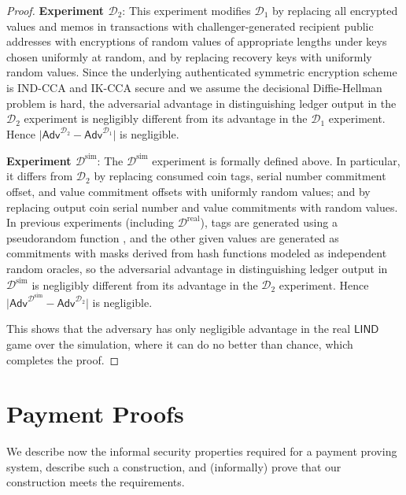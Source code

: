 \documentclass{llncs}
\newcommand{\func}[1]{\mathsf{#1}}
\begin{document}
\begin{proof}
\textbf{Experiment $\mathcal{D}_2$}: This experiment modifies $\mathcal{D}_{1}$ by replacing all encrypted values and memos in transactions with challenger-generated recipient public addresses with encryptions of random values of appropriate lengths under keys chosen uniformly at random, and by replacing recovery keys with uniformly random values.
Since the underlying authenticated symmetric encryption scheme is IND-CCA and IK-CCA secure and we assume the decisional Diffie-Hellman problem is hard, the adversarial advantage in distinguishing ledger output in the $\mathcal{D}_2$ experiment is negligibly different from its advantage in the $\mathcal{D}_{1}$ experiment.
Hence $\lvert \func{Adv}^{\mathcal{D}_2} - \func{Adv}^{\mathcal{D}_1} \rvert$ is negligible.

\textbf{Experiment $\mathcal{D}^{\text{sim}}$}: The $\mathcal{D}^{\text{sim}}$ experiment is formally defined above.
In particular, it differs from $\mathcal{D}_{2}$ by replacing consumed coin tags, serial number commitment offset, and value commitment offsets with uniformly random values; and by replacing output coin serial number and value commitments with random values.
In previous experiments (including $\mathcal{D}^{\text{real}}$), tags are generated using a pseudorandom function \cite{dodis}, and the other given values are generated as commitments with masks derived from hash functions modeled as independent random oracles, so the adversarial advantage in distinguishing ledger output in $\mathcal{D}^{\text{sim}}$ is negligibly different from its advantage in the $\mathcal{D}_2$ experiment.
Hence $\lvert \func{Adv}^{\mathcal{D}^{\text{sim}}} - \func{Adv}^{\mathcal{D}_2} \rvert$ is negligible.

This shows that the adversary has only negligible advantage in the real $\func{LIND}$ game over the simulation, where it can do no better than chance, which completes the proof.
\end{proof}


\section{Payment Proofs}
\label{app:payment}

We describe now the informal security properties required for a payment proving system, describe such a construction, and (informally) prove that our construction meets the requirements.
\end{document}
